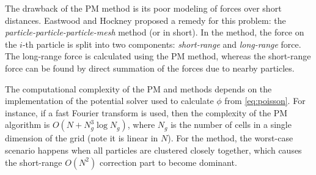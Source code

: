 The drawback of the PM method is its poor modeling of forces over short distances.
Eastwood and Hockney proposed a remedy for this problem: the \textit{particle-particle-particle-mesh} method (or \PThreeM{} in short).
In the \PThreeM{} method, the force on the $i$-th particle is split into two components: \textit{short-range} and \textit{long-range} force.
The long-range force is calculated using the PM method, whereas the short-range force can be found by direct summation of the forces due to nearby particles.

The computational complexity of the PM and \PThreeM{} methods depends on the implementation of the potential solver used to calculate $\phi$ from \autoref{eq:poisson}.
For instance, if a fast Fourier transform is used, then the complexity of the PM algorithm is $O(N + N_g^3\log N_g)$, where $N_g$ is the number of cells in a single dimension of the grid (note it is linear in $N$).
For the \PThreeM{} method, the worst-case scenario happens when all particles are clustered closely together, which causes the short-range $O(N^2)$ correction part to become dominant.

